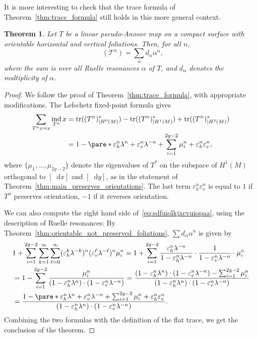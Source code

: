 \documentclass[11pt, a4paper, oneside, final, pagebackref]{amsart}
\newcommand{\boT}{\mathcal{T}}
\newcommand{\dd}{\mathop{}\!\mathrm{d}}
\newcommand{\restr}{|}
\DeclareMathOperator{\ind}{ind}
\DeclareMathOperator{\flattr}{\mathrm{tr}^{\flat}}
\DeclareMathOperator{\tr}{tr}
\renewcommand{\epsilon}{\varepsilon}
\newtheorem{thm}{Theorem}[section]
\theoremstyle{definition}
\numberwithin{equation}{section}
\begin{document}
It is more interesting to check that the trace formula of
Theorem~\ref{thm:trace_formula}  still holds in this more general context.
\begin{thm}
\label{thm:trace_orientable} Let $T$ be a linear pseudo-Anosov map on a
compact surface with orientable horizontal and vertical foliations. Then, for
all $n$,
\begin{equation}
\label{eq:sdfuiolkjxcvuiopaa}
  \flattr(\boT^n) = \sum_\alpha d_\alpha \alpha^n,
\end{equation}
where the sum is over all Ruelle resonances $\alpha$ of $T$, and $d_\alpha$
denotes the multiplicity of $\alpha$.
\end{thm}
\begin{proof}
We follow the proof of Theorem~\ref{thm:trace_formula}, with appropriate
modifications. The Lefschetz fixed-point formula gives
\begin{align*}
  \sum_{T^n x = x} \ind_{T^n} x
  &= \tr((T^n)_{\restr H^0(M)}^*) - \tr((T^n)_{\restr H^1(M)}^*) + \tr((T^n)_{\restr H^2(M)}^*)
  \\& = 1 - \pare*{\epsilon_h^n\lambda^n + \epsilon_v^n \lambda^{-n} + \sum_{i=1}^{2g-2} \mu_i^n} + \epsilon_h^n \epsilon_v^n,
\end{align*}
where $\{\mu_1,\dotsc, \mu_{2g-2}\}$ denote the eigenvalues of $T^*$ on the
subspace of $H^1(M)$ orthogonal to $[\dd x]$ and $[\dd y]$, as in the
statement of Theorem~\ref{thm:main_preserves_orientations}. The last term
$\epsilon_h^n \epsilon_v^n$ is equal to $1$ if $T^n$ preserves orientation,
$-1$ if it reverses orientation.

We can also compute the right hand side of~\eqref{eq:sdfuiolkjxcvuiopaa},
using the description of Ruelle resonances: By
Theorem~\ref{thm:orientable_not_preserved_foliations}, $\sum d_\alpha
\alpha^n$ is given by
\begin{align*}
  & 1 + \sum_{i=1}^{2g-2} \sum_{k=1}^\infty \sum_{\ell=0}^\infty
  (\epsilon_h^k \lambda^{-k})^n (\epsilon_v^\ell \lambda^{-\ell})^n \mu_i^n
  = 1 + \sum_{i=1}^{2g-2} \frac{ \epsilon_h^n \lambda^{-n}}{1-\epsilon_h^n \lambda^{-n}} \cdot \frac{1}{1-\epsilon_v^n \lambda^{-n}} \cdot \mu_i^n
  \\&
  = 1 - \sum_{i=1}^{2g-2} \frac{\mu_i^n}{(1-\epsilon_h^n \lambda^n) \cdot (1-\epsilon_v^n \lambda^{-n})}
  = \frac{(1-\epsilon_h^n \lambda^n) \cdot (1-\epsilon_v^n \lambda^{-n}) - \sum_{i=1}^{2g-2} \mu_i^n}{(1-\epsilon_h^n \lambda^n) \cdot (1-\epsilon_v^n
  \lambda^{-n})}
  \\&
  = \frac{1 - \pare*{\epsilon_h^n \lambda^n + \epsilon_v^n \lambda^{-n} + \sum_{i=1}^{2g-2} \mu_i^n} + \epsilon_h^n \epsilon_v^n} {(1-\epsilon_h^n \lambda^n) \cdot
  (1-\epsilon_v^n \lambda^{-n})}.
\end{align*}
Combining the two formulas with the definition of the flat trace, we get the
conclusion of the theorem.
\end{proof}
\end{document}
